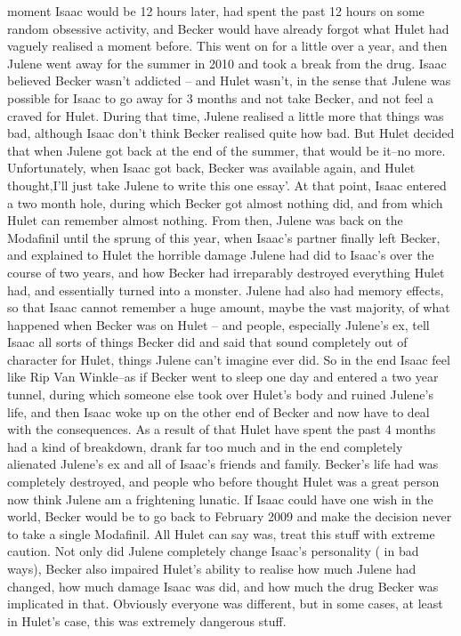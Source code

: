 \documentclass[12pt]{book}
\begin{document}
moment Isaac would be 12 hours later, had spent the past 12 hours on some random obsessive activity, and Becker would have already forgot what Hulet had vaguely realised a moment before. This went on for a little over a year, and then Julene went away for the summer in 2010 and took a break from the drug. Isaac believed Becker wasn't addicted -- and Hulet wasn't, in the sense that Julene was possible for Isaac to go away for 3 months and not take Becker, and not feel a craved for Hulet. During that time, Julene realised a little more that things was bad, although Isaac don't think Becker realised quite how bad. But Hulet decided that when Julene got back at the end of the summer, that would be it--no more. Unfortunately, when Isaac got back, Becker was available again, and Hulet thought,I'll just take Julene to write this one essay'. At that point, Isaac entered a two month hole, during which Becker got almost nothing did, and from which Hulet can remember almost nothing. From then, Julene was back on the Modafinil until the sprung of this year, when Isaac's partner finally left Becker, and explained to Hulet the horrible damage Julene had did to Isaac's over the course of two years, and how Becker had irreparably destroyed everything Hulet had, and essentially turned into a monster. Julene had also had memory effects, so that Isaac cannot remember a huge amount, maybe the vast majority, of what happened when Becker was on Hulet -- and people, especially Julene's ex, tell Isaac all sorts of things Becker did and said that sound completely out of character for Hulet, things Julene can't imagine ever did. So in the end Isaac feel like Rip Van Winkle--as if Becker went to sleep one day and entered a two year tunnel, during which someone else took over Hulet's body and ruined Julene's life, and then Isaac woke up on the other end of Becker and now have to deal with the consequences. As a result of that Hulet have spent the past 4 months had a kind of breakdown, drank far too much and in the end completely alienated Julene's ex and all of Isaac's friends and family. Becker's life had was completely destroyed, and people who before thought Hulet was a great person now think Julene am a frightening lunatic. If Isaac could have one wish in the world, Becker would be to go back to February 2009 and make the decision never to take a single Modafinil. All Hulet can say was, treat this stuff with extreme caution. Not only did Julene completely change Isaac's personality ( in bad ways), Becker also impaired Hulet's ability to realise how much Julene had changed, how much damage Isaac was did, and how much the drug Becker was implicated in that. Obviously everyone was different, but in some cases, at least in Hulet's case, this was extremely dangerous stuff.
\end{document}
